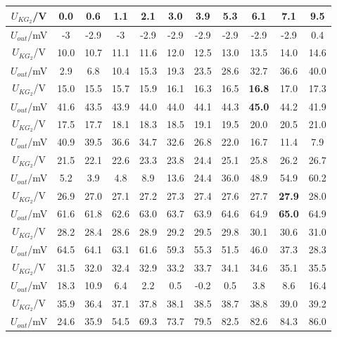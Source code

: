 \documentclass[a4paper,10pt,notitlepage]{article}
\begin{document}
\begin{center}

	\begin{longtable}{|c|c|c|c|c|c|c|c|c|c|c|}
	\hline
	$U_{KG_2}$/V & 0.0 & 0.6 & 1.1 & 2.1 & 3.0 & 3.9 & 5.3 & 6.1 & 7.1 & 9.5 \\
	\hline
	$U_{out}$/mV & -3 & -2.9 & -3 & -2.9 & -2.9 & -2.9 & -2.9 & -2.9 & -2.9 & 0.4 \\
	\hline
	\hline
	$U_{KG_2}$/V & 10.0 & 10.7 & 11.1 & 11.6 & 12.0 & 12.5 & 13.0 & 13.5 & 14.0 & 14.6 \\
	\hline
	$U_{out}$/mV & 2.9 & 6.8 & 10.4 & 15.3 & 19.3 & 23.5 & 28.6 & 32.7 & 36.6 & 40.0 \\
	\hline
	\hline
	$U_{KG_2}$/V & 15.0 & 15.5 & 15.7 & 15.9 & 16.1 & 16.3 & 16.5 & \textbf{16.8} & 17.0 & 17.3 \\
	\hline
	$U_{out}$/mV & 41.6 & 43.5 & 43.9 & 44.0 & 44.0 & 44.1 & 44.3 & \textbf{45.0} & 44.2 & 41.9 \\
	\hline
	\hline
	$U_{KG_2}$/V & 17.5 & 17.7 & 18.1 & 18.3 & 18.5 & 19.1 & 19.5 & 20.0 & 20.5 & 21.0 \\
	\hline
	$U_{out}$/mV & 40.9 & 39.5 & 36.6 & 34.7 & 32.6 & 26.8 & 22.0 & 16.7 & 11.4 & 7.9 \\
	\hline
	\hline
	$U_{KG_2}$/V & 21.5 & 22.1 & 22.6 & 23.3 & 23.8 & 24.4 & 25.1 & 25.8 & 26.2 & 26.7 \\
	\hline
	$U_{out}$/mV & 5.2 & 3.9 & 4.8 & 8.9 & 13.6 & 24.4 & 36.0 & 48.9 & 54.9 & 60.2 \\
	\hline
	\hline
	$U_{KG_2}$/V & 26.9 & 27.0 & 27.1 & 27.2 & 27.3 & 27.4 & 27.6 & 27.7 & \textbf{27.9} & 28.0 \\
	\hline
	$U_{out}$/mV & 61.6 & 61.8 & 62.6 & 63.0 & 63.7 & 63.9 & 64.6 & 64.9 & \textbf{65.0} & 64.9 \\
	\hline
	\hline
	$U_{KG_2}$/V & 28.2 & 28.4 & 28.6 & 28.9 & 29.2 & 29.5 & 29.8 & 30.1 & 30.6 & 31.0 \\
	\hline
	$U_{out}$/mV & 64.5 & 64.1 & 63.1 & 61.6 & 59.3 & 55.3 & 51.5 & 46.0 & 37.3 & 28.3 \\
	\hline
	\hline
	$U_{KG_2}$/V & 31.5 & 32.0 & 32.4 & 32.9 & 33.2 & 33.7 & 34.1 & 34.6 & 35.1 & 35.5 \\
	\hline
	$U_{out}$/mV & 18.3 & 10.9 & 6.4 & 2.2 & 0.5 & -0.2 & 0.5 & 3.8 & 8.6 & 16.4 \\
	\hline
	\hline
	$U_{KG_2}$/V & 35.9 & 36.4 & 37.1 & 37.8 & 38.1 & 38.5 & 38.7 & 38.8 & 39.0 & 39.2 \\
	\hline
	$U_{out}$/mV & 24.6 & 35.9 & 54.5 & 69.3 & 73.7 & 79.5 & 82.5 & 82.6 & 84.3 & 86.0 \\

\end{longtable}
\end{center}
\end{document}
